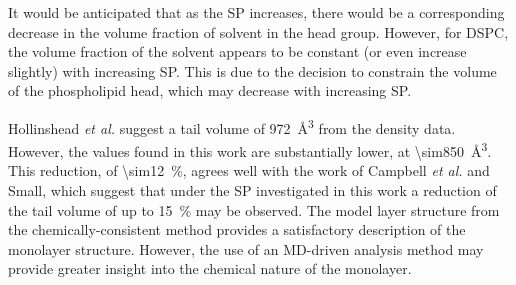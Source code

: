 It would be anticipated that as the SP increases, there would be a corresponding decrease in the volume fraction of solvent in the head group.\autocite{bayerl_specular_1990}
However, for DSPC, the volume fraction of the solvent appears to be constant (or even increase slightly) with increasing SP.
This is due to the decision to constrain the volume of the phospholipid head, which may decrease with increasing SP.

Hollinshead \emph{et al.}\autocite{hollinshead_effects_2009} suggest a tail volume of \SI{972}{\angstrom\cubed} from the density data.
However, the values found in this work are substantially lower, at \SI{\sim850}{\angstrom\cubed}.
This reduction, of \SI{\sim12}{\percent}, agrees well with the work of Campbell \emph{et al.}\autocite{campbell_structure_2018} and Small,\autocite{small_lateral_1984} which suggest that under the SP investigated in this work a reduction of the tail volume of up to \SI{15}{\percent} may be observed.
The model layer structure from the chemically-consistent method provides a satisfactory description of the monolayer structure.
However, the use of an MD-driven analysis method may provide greater insight into the chemical nature of the monolayer.

